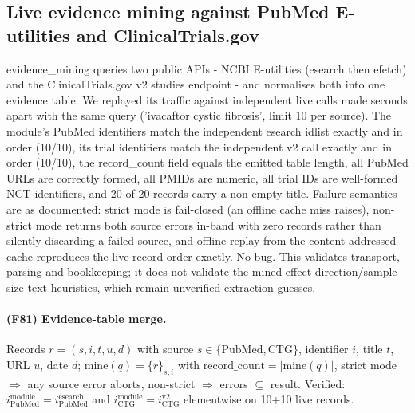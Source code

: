 \subsection{Live evidence mining against PubMed E-utilities and ClinicalTrials.gov}
evidence\_mining queries two public APIs - NCBI E-utilities (esearch then efetch) and the ClinicalTrials.gov v2 studies endpoint - and normalises both into one evidence table. We replayed its traffic against independent live calls made seconds apart with the same query ('ivacaftor cystic fibrosis', limit 10 per source). The module's PubMed identifiers match the independent esearch idlist exactly and in order (10/10), its trial identifiers match the independent v2 call exactly and in order (10/10), the record\_count field equals the emitted table length, all PubMed URLs are correctly formed, all PMIDs are numeric, all trial IDs are well-formed NCT identifiers, and 20 of 20 records carry a non-empty title. Failure semantics are as documented: strict mode is fail-closed (an offline cache miss raises), non-strict mode returns both source errors in-band with zero records rather than silently discarding a failed source, and offline replay from the content-addressed cache reproduces the live record order exactly. No bug. This validates transport, parsing and bookkeeping; it does not validate the mined effect-direction/sample-size text heuristics, which remain unverified extraction guesses.
\paragraph{(F81) Evidence-table merge.} Records $r=(s,i,t,u,d)$ with source $s\in\{\mathrm{PubMed},\mathrm{CTG}\}$, identifier $i$, title $t$, URL $u$, date $d$; $\mathrm{mine}(q)=\{r\}_{s,i}$ with $\mathrm{record\_count}=|\mathrm{mine}(q)|$, strict mode $\Rightarrow$ any source error aborts, non-strict $\Rightarrow$ errors $\subseteq$ result. Verified: $i_{\mathrm{PubMed}}^{\mathrm{module}}=i_{\mathrm{PubMed}}^{\mathrm{esearch}}$ and $i_{\mathrm{CTG}}^{\mathrm{module}}=i_{\mathrm{CTG}}^{\mathrm{v2}}$ elementwise on 10+10 live records.
